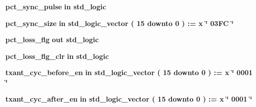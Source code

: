 \begin{DoxyCompactItemize}
{\bf pct\+\_\+sync\+\_\+pulse}  {\bfseries {\bfseries \textcolor{keywordflow}{in}\textcolor{vhdlchar}{ }}} {\bfseries \textcolor{comment}{std\+\_\+logic}\textcolor{vhdlchar}{ }} 
\item 
{\bf pct\+\_\+sync\+\_\+size}  {\bfseries {\bfseries \textcolor{keywordflow}{in}\textcolor{vhdlchar}{ }}} {\bfseries \textcolor{comment}{std\+\_\+logic\+\_\+vector}\textcolor{vhdlchar}{ }\textcolor{vhdlchar}{(}\textcolor{vhdlchar}{ }\textcolor{vhdlchar}{ } \textcolor{vhdldigit}{15} \textcolor{vhdlchar}{ }\textcolor{keywordflow}{downto}\textcolor{vhdlchar}{ }\textcolor{vhdlchar}{ } \textcolor{vhdldigit}{0} \textcolor{vhdlchar}{ }\textcolor{vhdlchar}{)}\textcolor{vhdlchar}{ }\textcolor{vhdlchar}{ }\textcolor{vhdlchar}{ }\textcolor{vhdlchar}{\+:}\textcolor{vhdlchar}{=}\textcolor{vhdlchar}{ }\textcolor{vhdlchar}{ }\textcolor{vhdlchar}{x}\textcolor{vhdlchar}{ }\textcolor{keyword}{\char`\"{} 03\+F\+C \char`\"{}}\textcolor{vhdlchar}{ }} 
\item 
{\bf pct\+\_\+loss\+\_\+flg}  {\bfseries {\bfseries \textcolor{keywordflow}{out}\textcolor{vhdlchar}{ }}} {\bfseries \textcolor{comment}{std\+\_\+logic}\textcolor{vhdlchar}{ }} 
\item 
{\bf pct\+\_\+loss\+\_\+flg\+\_\+clr}  {\bfseries {\bfseries \textcolor{keywordflow}{in}\textcolor{vhdlchar}{ }}} {\bfseries \textcolor{comment}{std\+\_\+logic}\textcolor{vhdlchar}{ }} 
\item 
{\bf txant\+\_\+cyc\+\_\+before\+\_\+en}  {\bfseries {\bfseries \textcolor{keywordflow}{in}\textcolor{vhdlchar}{ }}} {\bfseries \textcolor{comment}{std\+\_\+logic\+\_\+vector}\textcolor{vhdlchar}{ }\textcolor{vhdlchar}{(}\textcolor{vhdlchar}{ }\textcolor{vhdlchar}{ } \textcolor{vhdldigit}{15} \textcolor{vhdlchar}{ }\textcolor{keywordflow}{downto}\textcolor{vhdlchar}{ }\textcolor{vhdlchar}{ } \textcolor{vhdldigit}{0} \textcolor{vhdlchar}{ }\textcolor{vhdlchar}{)}\textcolor{vhdlchar}{ }\textcolor{vhdlchar}{ }\textcolor{vhdlchar}{ }\textcolor{vhdlchar}{\+:}\textcolor{vhdlchar}{=}\textcolor{vhdlchar}{ }\textcolor{vhdlchar}{ }\textcolor{vhdlchar}{x}\textcolor{vhdlchar}{ }\textcolor{keyword}{\char`\"{} 0001 \char`\"{}}\textcolor{vhdlchar}{ }} 
\item 
{\bf txant\+\_\+cyc\+\_\+after\+\_\+en}  {\bfseries {\bfseries \textcolor{keywordflow}{in}\textcolor{vhdlchar}{ }}} {\bfseries \textcolor{comment}{std\+\_\+logic\+\_\+vector}\textcolor{vhdlchar}{ }\textcolor{vhdlchar}{(}\textcolor{vhdlchar}{ }\textcolor{vhdlchar}{ } \textcolor{vhdldigit}{15} \textcolor{vhdlchar}{ }\textcolor{keywordflow}{downto}\textcolor{vhdlchar}{ }\textcolor{vhdlchar}{ } \textcolor{vhdldigit}{0} \textcolor{vhdlchar}{ }\textcolor{vhdlchar}{)}\textcolor{vhdlchar}{ }\textcolor{vhdlchar}{ }\textcolor{vhdlchar}{ }\textcolor{vhdlchar}{\+:}\textcolor{vhdlchar}{=}\textcolor{vhdlchar}{ }\textcolor{vhdlchar}{ }\textcolor{vhdlchar}{x}\textcolor{vhdlchar}{ }\textcolor{keyword}{\char`\"{} 0001 \char`\"{}}\textcolor{vhdlchar}{ }} 

\end{DoxyCompactItemize}

